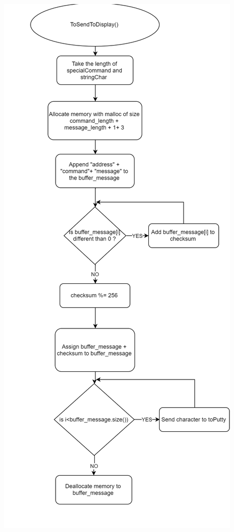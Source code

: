 \documentclass[a4paper,12pt]{article}
\begin{document}
\begin{center}
\includegraphics[scale=0.6]{img/Task4-1.png}
\end{center}
\end{document}
